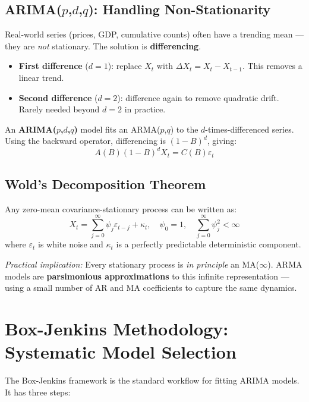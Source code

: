 \documentclass[11pt]{article}
\begin{document}
\subsection{ARIMA($p$,$d$,$q$): Handling Non-Stationarity}
Real-world series (prices, GDP, cumulative counts) often have a trending mean
--- they are \emph{not} stationary. The solution is \textbf{differencing}.

\begin{itemize}
    \item \textbf{First difference} ($d = 1$): replace $X_t$ with
      $\Delta X_t = X_t - X_{t-1}$. This removes a linear trend.
    \item \textbf{Second difference} ($d = 2$): difference again to remove
      quadratic drift. Rarely needed beyond $d = 2$ in practice.
\end{itemize}

An \textbf{ARIMA($p$,$d$,$q$)} model fits an ARMA($p$,$q$) to the
$d$-times-differenced series. Using the backward operator, differencing is
$(1 - B)^d$, giving:
\[
A(B)(1-B)^d X_t = C(B)\varepsilon_t
\]

\subsection{Wold's Decomposition Theorem}
Any zero-mean covariance-stationary process can be written as:
\[
X_t = \sum_{j=0}^{\infty} \psi_j \varepsilon_{t-j} + \kappa_t, \quad
\psi_0 = 1,\quad \sum_{j=0}^{\infty} \psi_j^2 < \infty
\]
where $\varepsilon_t$ is white noise and $\kappa_t$ is a perfectly predictable
deterministic component.

\textit{Practical implication:} Every stationary process is \emph{in principle}
an MA($\infty$). ARMA models are \textbf{parsimonious approximations} to this
infinite representation --- using a small number of AR and MA coefficients
to capture the same dynamics.


\section{Box-Jenkins Methodology: Systematic Model Selection}

The Box-Jenkins framework is the standard workflow for fitting ARIMA models.
It has three steps:
\end{document}
